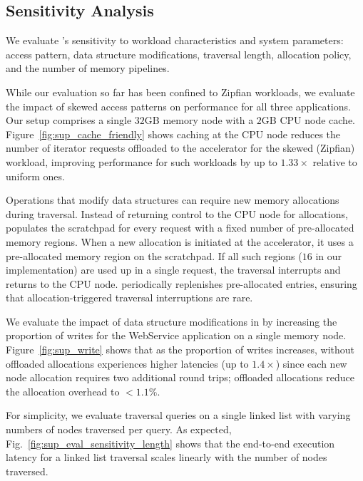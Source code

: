 \subsection{\pulse Sensitivity Analysis}
\label{ssec:pulsesensitivity}


We evaluate \pulse's sensitivity to workload characteristics and system parameters: access pattern, data structure modifications, traversal length, allocation policy, and the number of \pulse memory pipelines. 


While our evaluation so far has been confined to Zipfian workloads, we evaluate the impact of skewed access patterns on \pulse performance for all three applications. Our setup comprises a single $32$GB memory node with a $2$GB CPU node cache. Figure~\ref{fig:sup_cache_friendly} shows caching at the CPU node reduces the number of iterator requests offloaded to the \pulse accelerator for the skewed (Zipfian) workload, improving \pulse performance for such workloads by up to $1.33\times$ relative to uniform ones.

 Operations that modify data structures can require new memory allocations during traversal. Instead of returning control to the CPU node for allocations, \pulse populates the scratchpad for every request with a fixed number of pre-allocated memory regions. When a new allocation is initiated at the \pulse accelerator, it uses a pre-allocated memory region on the scratchpad. If all such regions ($16$ in our implementation) are used up in a single request, the traversal interrupts and returns to the CPU node. \pulse periodically replenishes pre-allocated entries, ensuring that allocation-triggered traversal interruptions are rare.

We evaluate the impact of data structure modifications in \pulse by increasing the proportion of writes for the WebService application on a single memory node. Figure~\ref{fig:sup_write} shows that as the proportion of writes increases, \pulse without offloaded allocations experiences higher latencies (up to $1.4\times$) since each new node allocation requires two additional round trips; offloaded allocations reduce the allocation overhead to $<1.1\%$.

 For simplicity, we evaluate traversal queries on a single linked list with varying numbers of nodes traversed per query. As expected, Fig.~\ref{fig:sup_eval_sensitivity_length} shows that the end-to-end execution latency for a linked list traversal scales linearly with the number of nodes traversed.

